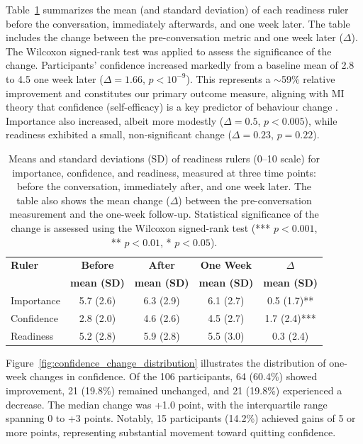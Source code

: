 Table~\ref{table:mibot_ruler_summary} summarizes the mean (and standard deviation) of each readiness ruler before the conversation, immediately afterwards, and one week later. The table includes the change between the pre-conversation metric and one week later ($\Delta$). The Wilcoxon signed-rank test was applied to assess the significance of the change. Participants' confidence increased markedly from a baseline mean of 2.8 to 4.5 one week later ($\Delta=1.66$, $p<10^{-9}$). This represents a $\sim$59\% relative improvement and constitutes our primary outcome measure, aligning with MI theory that confidence (self-efficacy) is a key predictor of behaviour change \citep{Gwaltney2009-wj,Abar2013}. Importance also increased, albeit more modestly ($\Delta=0.5$, $p<0.005$), while readiness exhibited a small, non-significant change ($\Delta=0.23$, $p=0.22$).

\begin{table}[ht!]
  \centering
  \small
  \setlength{\tabcolsep}{4pt}
  \renewcommand{\arraystretch}{1.1}
  \begin{tabular}{@{}lcccc@{}}
    \toprule
    \textbf{Ruler} & \textbf{Before} & \textbf{After} & \textbf{One Week} & \textbf{$\Delta$} \\
    & \textbf{mean (SD)} & \textbf{mean (SD)} & \textbf{mean (SD)} & \textbf{mean (SD)} \\
    \midrule
    Importance & 5.7 (2.6) & 6.3 (2.9) & 6.1 (2.7) & 0.5 (1.7)** \\
    Confidence & 2.8 (2.0) & 4.6 (2.6) & 4.5 (2.7) & 1.7 (2.4)*** \\
    Readiness  & 5.2 (2.8) & 5.9 (2.8) & 5.5 (3.0) & 0.3 (2.4) \\
    \bottomrule
  \end{tabular}
  \caption[MIBot Readiness Ruler Summary]{Means and standard deviations (SD) of readiness rulers (0--10 scale) for importance, confidence, and readiness, measured at three time points: before the conversation, immediately after, and one week later. The table also shows the mean change ($\Delta$) between the pre-conversation measurement and the one-week follow-up. Statistical significance of the change is assessed using the Wilcoxon signed-rank test (*** $p < 0.001$, ** $p < 0.01$, * $p < 0.05$).}
  \label{table:mibot_ruler_summary}
\end{table}

Figure~\ref{fig:confidence_change_distribution} illustrates the distribution of one-week changes in confidence. Of the 106 participants, 64 (60.4\%) showed improvement, 21 (19.8\%) remained unchanged, and 21 (19.8\%) experienced a decrease. The median change was +1.0 point, with the interquartile range spanning 0 to +3 points. Notably, 15 participants (14.2\%) achieved gains of 5 or more points, representing substantial movement toward quitting confidence.


